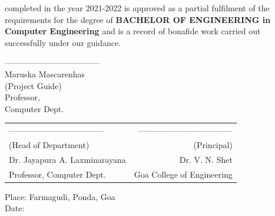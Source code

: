 \noindent completed in the year 2021-2022 is approved as a partial fulfilment of the requirements for the degree of {\bfseries BACHELOR OF ENGINEERING in Computer Engineering} and is a record of bonafide work carried out successfully under our guidance.\\


\vspace{0.8cm}


\noindent -----------------------------------\\
Maruska Mascarenhas\\
(Project Guide)\\
Professor,\\
Computer Dept.\\



\begin{table}[H]
\begin{tabular}{lr}
\noindent ----------------------------------- & \hspace{6cm} ----------------------------------- \\
(Head of Department) & (Principal)\\
Dr. Jayapura A. Laxminarayana  & Dr. V. N. Shet\\
Professor, Computer Dept. & Goa College of Engineering\\
\end{tabular}
\end{table}
\vspace{0.5cm}
\noindent Place: Farmagudi, Ponda, Goa\\
\noindent Date: 

